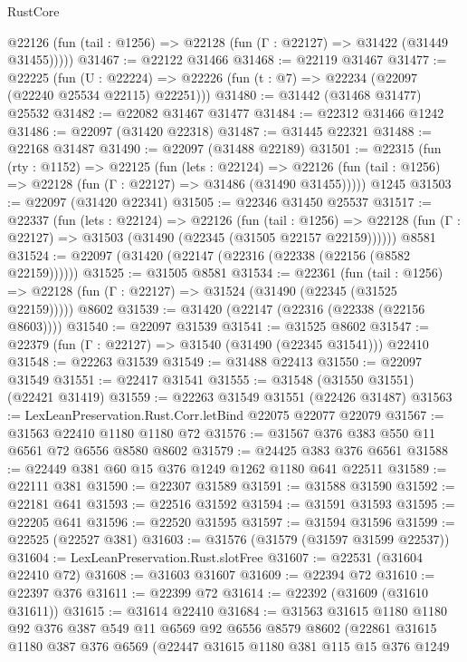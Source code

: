 \begin{lexlean}{RustCore}
\begin{coremodule}
      @22126 (fun (tail : @1256) => @22128 (fun (Γ : @22127) => @31422 (@31449 @31455)))))
@31467 := @22122 @31466
@31468 := @22119 @31467
@31477 := @22225
    (fun (U : @22224) => @22226 (fun (t : @7) => @22234 (@22097 (@22240 @25534 @22115) @22251)))
@31480 := @31442 (@31468 @31477) @25532
@31482 := @22082 @31467 @31477
@31484 := @22312 @31466 @1242
@31486 := @22097 (@31420 @22318)
@31487 := @31445 @22321
@31488 := @22168 @31487
@31490 := @22097 (@31488 @22189)
@31501 := @22315
    (fun (rty : @1152) =>
    @22125
      (fun (lets : @22124) =>
      @22126 (fun (tail : @1256) => @22128 (fun (Γ : @22127) => @31486 (@31490 @31455)))))
    @1245
@31503 := @22097 (@31420 @22341)
@31505 := @22346 @31450 @25537
@31517 := @22337
    (fun (lets : @22124) =>
    @22126
      (fun (tail : @1256) =>
      @22128 (fun (Γ : @22127) => @31503 (@31490 (@22345 (@31505 @22157 @22159))))))
    @8581
@31524 := @22097 (@31420 (@22147 (@22316 (@22338 (@22156 (@8582 @22159))))))
@31525 := @31505 @8581
@31534 := @22361
    (fun (tail : @1256) => @22128 (fun (Γ : @22127) => @31524 (@31490 (@22345 (@31525 @22159)))))
    @8602
@31539 := @31420 (@22147 (@22316 (@22338 (@22156 @8603))))
@31540 := @22097 @31539
@31541 := @31525 @8602
@31547 := @22379 (fun (Γ : @22127) => @31540 (@31490 (@22345 @31541))) @22410
@31548 := @22263 @31539
@31549 := @31488 @22413
@31550 := @22097 @31549
@31551 := @22417 @31541
@31555 := @31548 (@31550 @31551) (@22421 @31419)
@31559 := @22263 @31549 @31551 (@22426 @31487)
@31563 := LexLeanPreservation.Rust.Corr.letBind @22075 @22077 @22079
@31567 := @31563 @22410 @1180 @1180 @72
@31576 := @31567 @376 @383 @550 @11 @6561 @72 @6556 @8580 @8602
@31579 := @24425 @383 @376 @6561
@31588 := @22449 @381 @60 @15 @376 @1249 @1262 @1180 @641 @22511
@31589 := @22111 @381
@31590 := @22307 @31589
@31591 := @31588 @31590
@31592 := @22181 @641
@31593 := @22516 @31592
@31594 := @31591 @31593
@31595 := @22205 @641
@31596 := @22520 @31595
@31597 := @31594 @31596
@31599 := @22525 (@22527 @381)
@31603 := @31576 (@31579 (@31597 @31599 @22537))
@31604 := LexLeanPreservation.Rust.slotFree
@31607 := @22531 (@31604 @22410 @72)
@31608 := @31603 @31607
@31609 := @22394 @72
@31610 := @22397 @376
@31611 := @22399 @72
@31614 := @22392 (@31609 (@31610 @31611))
@31615 := @31614 @22410
@31684 := @31563
    @31615
    @1180
    @1180
    @92
    @376
    @387
    @549
    @11
    @6569
    @92
    @6556
    @8579
    @8602
    (@22861
      @31615
      @1180
      @387
      @376
      @6569
      (@22447
        @31615
        @1180
        @381
        @115
        @15
        @376
        @1249

\end{coremodule}
\end{lexlean}
